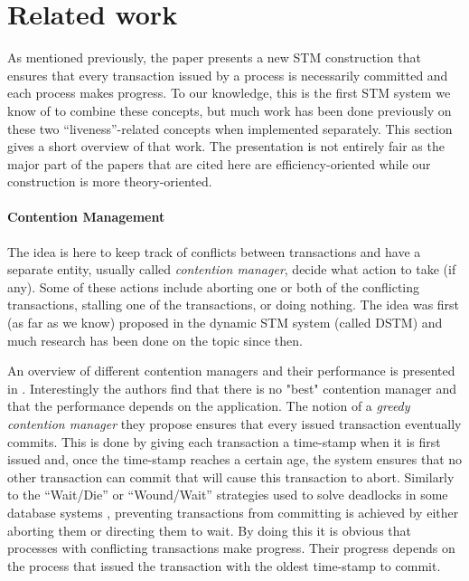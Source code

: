 
\section{Related work}
\label{sec:related-work}

As mentioned previously, the paper  presents a  new STM construction  that ensures that every 
transaction issued by a process is necessarily committed and  each process 
makes progress. To  our knowledge,  this  is the  first STM  system 
we  know of  to combine  these
concepts, but much work has been done previously on these two 
``liveness''-related concepts when 
implemented separately. This  section gives  a short  overview of that work.
The presentation is not entirely fair as  the major part of the papers 
that are cited here are efficiency-oriented while our construction is
more theory-oriented.  



\paragraph{Contention Management} The idea is here to keep
track of conflicts between transactions and have a separate entity, usually
called {\it contention manager}, decide what action to take (if any). 
Some  of these  actions include  aborting one  or both  of  the conflicting
transactions, stalling one of the transactions, or doing nothing. 
The idea  was  first (as far as we know) proposed  in  the dynamic 
STM system (called DSTM) \cite{HLMS03} and much research has been done on the
topic since then. 

An overview  of different contention managers and their performance is
presented  in \cite{GHP05}. Interestingly the authors find that there is no 
"best" contention manager and that the performance depends on the application. 
The notion of a {\it greedy contention manager} they propose
ensures that every issued transaction  eventually commits. 
This  is done  by giving  each transaction  a time-stamp  when it  is first
issued and,  once the  time-stamp reaches a  certain age, the  system ensures
that no  other transaction can commit  that will cause  this transaction to
abort.  Similarly to  the ``Wait/Die''  or ``Wound/Wait''
strategies used to solve deadlocks in some database systems  \cite{RSL78}, 
preventing  transactions from committing is  achieved by either
aborting them or directing them to wait. 
By  doing  this   it  is  obvious  that  processes  with  conflicting
transactions  make progress. Their progress  depends on the  process that
issued the transaction  with the oldest time-stamp to commit. 

